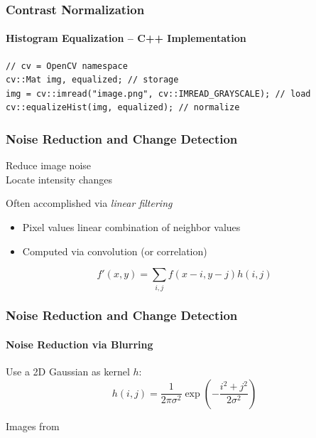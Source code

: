 \documentclass[xetex,professionalfont]{beamer}
\begin{document}

\begin{frame}[fragile]
\frametitle{Contrast Normalization}
\framesubtitle{Histogram Equalization -- C++ Implementation}

\begin{verbatim}
// cv = OpenCV namespace
cv::Mat img, equalized; // storage
img = cv::imread("image.png", cv::IMREAD_GRAYSCALE); // load
cv::equalizeHist(img, equalized); // normalize
\end{verbatim}

\end{frame}


\begin{frame}
\frametitle{Noise Reduction and Change Detection}

Reduce image noise\\\medskip
Locate intensity changes

\bigskip
Often accomplished via \emph{linear filtering}
\begin{itemize}
	\item Pixel values linear combination of neighbor values
	\item Computed via convolution (or correlation)
\end{itemize}

\[
f'(x,y) = \sum_{i,j}f(x-i,y-j)h(i,j) %
\]

\end{frame}


\begin{frame}
\frametitle{Noise Reduction and Change Detection}
\framesubtitle{Noise Reduction via Blurring}

Use a 2D Gaussian as kernel $h$:
\[
h(i,j)=\frac{1}{2\pi\sigma^2}\exp\left(-\frac{i^2+j^2}{2\sigma^2}\right)
\]

\begin{center}
	{\centering Images from \cite{prince12}}
\end{center}

\end{frame}
\end{document}
